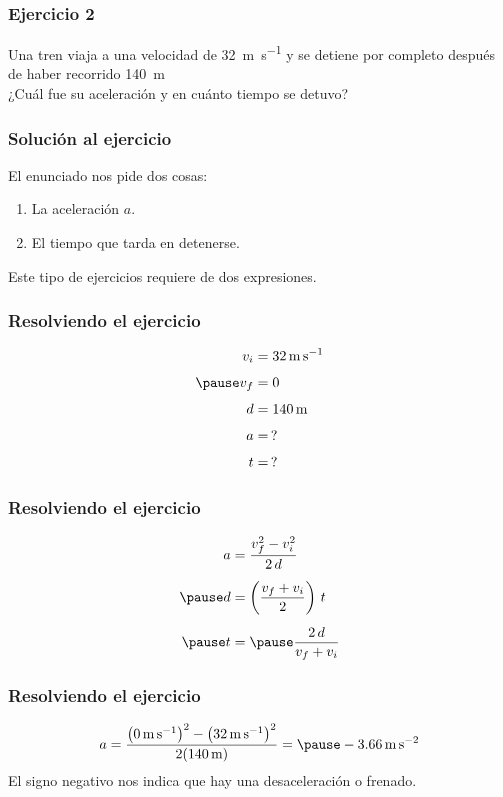 \documentclass[14pt]{beamer}
\begin{document}
\begin{frame}
\frametitle{Ejercicio 2}
Una tren viaja a una velocidad de \SI{32}{\meter\per\second} y se detiene por completo después de haber recorrido \SI{140}{\meter}
\\
\bigskip
\pause
¿Cuál fue su aceleración y en cuánto tiempo se detuvo?
\end{frame}
\begin{frame}
\frametitle{Solución al ejercicio}
El enunciado nos pide dos cosas:
\begin{enumerate}[<+->]
\item La aceleración $a$.
\item El tiempo que tarda en detenerse.
\end{enumerate}
\pause Este tipo de ejercicios requiere de dos expresiones.
\end{frame}
\begin{frame}
\frametitle{Resolviendo el ejercicio}
\begin{align*}
v_{i} &= \SI{32}{\meter\per\second} \\[0.4em] \pause
v_{f} &= 0 \\[0.4em]
d &= \SI{140}{\meter} \\[0.4em]
a &= \, ? \\[0.4em]
t &= \, ?
\end{align*}
\end{frame}
\begin{frame}
\frametitle{Resolviendo el ejercicio}
\pause
\begin{eqnarray*}
\begin{aligned}
a &= \dfrac{v_{f}^{2} - v_{i}^{2}}{2 \, d} \\[0.5em] \pause
d &= \left( \dfrac{v_{f} + v_{i}}{2} \right) \, t \\[0.5em] \pause
t &= \pause \dfrac{2 \, d}{v_{f} + v_{i}}
\end{aligned}
\end{eqnarray*}
\end{frame}
\begin{frame}
\frametitle{Resolviendo el ejercicio}
\pause
\begin{eqnarray*}
\begin{aligned}
a = \dfrac{ \left( \SI{0}{\meter\per\second} \right)^{2} - \left( \SI{32}{\meter\per\second} \right)^{2} }{2 ( \SI{140}{\meter})} = \pause - \SI{3.66}{\meter\per\square\second}
\end{aligned}
\end{eqnarray*}
El signo negativo nos indica que hay una desaceleración o frenado.
\end{frame}
\end{document}
